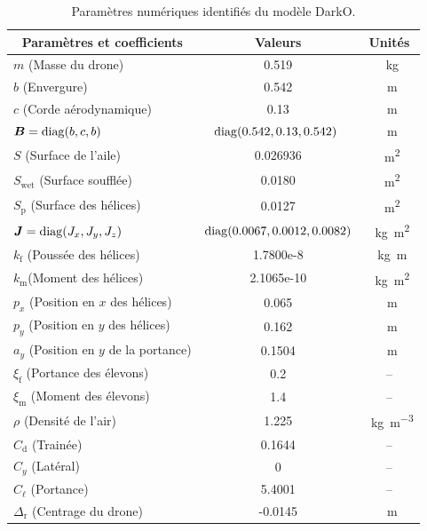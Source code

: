 \begin{table}[h]
    \centering
      \begin{tabular}{|l|c|c|}
        \hline
        \multicolumn{1}{|c|}{Paramètres et coefficients} & Valeurs & Unités \\
        \hline
        $m$ (Masse du drone)  & 0.519 & \SI{}{\kilogram} \\
        \hline
        $b$ (Envergure)  & 0.542 & \SI{}{\meter} \\
        \hline
        $c$ (Corde aérodynamique)  & 0.13 & \SI{}{\meter} \\
        \hline
        $\boldsymbol{B}=\operatorname{diag}(b,c,b)$ & $\!\!\operatorname{diag}(0.542, 0.13, 0.542)$ \!\! & \SI{}{\meter}\\
        \hline
        $S$ (Surface de l'aile) & 0.026936 & \SI{}{\square\meter}\\
        \hline
        $S_{\text{wet}}$ (Surface soufflée) & 0.0180 & \SI{}{\square\meter}\\
        \hline
        $S_{\text{p}}$ (Surface des hélices) & 0.0127 & \SI{}{\square\meter}\\
        \hline
        $\boldsymbol{J}=\operatorname{diag}(J_{x},J_{y},J_{z})$ & \!\! $\operatorname{diag}(0.0067,0.0012,0.0082)$\!\! & \SI{}{\kilogram\square\meter}\\
        \hline
        $k_{\text{f}}$ (Poussée des hélices) & 1.7800e-8 & \SI{}{\kilogram\meter}\\
        \hline
        $k_{\text{m}}$(Moment des hélices) & 2.1065e-10 & \SI{}{\kilogram\square\meter}\\
        \hline
        $p_{x}$ (Position en $x$ des hélices) & 0.065 & \SI{}{\meter}\\
        \hline
        $p_{y}$ (Position en $y$  des hélices) & 0.162 & \SI{}{\meter}\\
        \hline
        $a_{y}$ (Position en $y$ de la portance) & 0.1504 & \SI{}{\meter}\\
        \hline
        $\xi_{\text{f}}$ (Portance des élevons) & 0.2 & --\\
        \hline
        $\xi_{\text{m}}$ (Moment des élevons) & 1.4 & --\\
        \hline
        $\rho$ (Densité de l'air) & 1.225 & \SI{}{\kilogram\per\cubic\meter}\\
        \hline
        $C_{\text{d}}$ (Trainée) & 0.1644 & --\\
        \hline
        $C_{y}$ (Latéral) & 0 & --\\
        \hline
         $C_{\ell}$ (Portance) & 5.4001 & --\\
        \hline
        $\Delta_{\text{r}}$ (Centrage du drone) & -0.0145 & \SI{}{\meter}\\
        \hline
      \end{tabular}
      \caption{Paramètres numériques identifiés du modèle DarkO.}
      \label{tab:pars}
\end{table}

